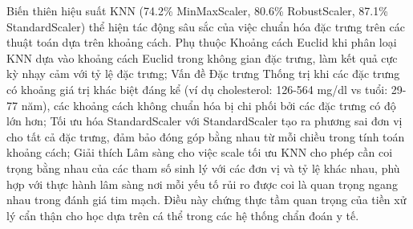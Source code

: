 Biến thiên hiệu suất KNN (74.2\% MinMaxScaler, 80.6\% RobustScaler, 87.1\% StandardScaler) thể hiện tác động sâu sắc của việc chuẩn hóa đặc trưng trên các thuật toán dựa trên khoảng cách. Phụ thuộc Khoảng cách Euclid khi phân loại KNN dựa vào khoảng cách Euclid trong không gian đặc trưng, làm kết quả cực kỳ nhạy cảm với tỷ lệ đặc trưng; Vấn đề Đặc trưng Thống trị khi các đặc trưng có khoảng giá trị khác biệt đáng kể (ví dụ cholesterol: 126-564 mg/dl vs tuổi: 29-77 năm), các khoảng cách không chuẩn hóa bị chi phối bởi các đặc trưng có độ lớn hơn; Tối ưu hóa StandardScaler với StandardScaler tạo ra phương sai đơn vị cho tất cả đặc trưng, đảm bảo đóng góp bằng nhau từ mỗi chiều trong tính toán khoảng cách; Giải thích Lâm sàng cho việc scale tối ưu KNN cho phép cần coi trọng bằng nhau của các tham số sinh lý với các đơn vị và tỷ lệ khác nhau, phù hợp với thực hành lâm sàng nơi mỗi yếu tố rủi ro được coi là quan trọng ngang nhau trong đánh giá tim mạch. Điều này chứng thực tầm quan trọng của tiền xử lý cẩn thận cho học dựa trên cá thể trong các hệ thống chẩn đoán y tế.

